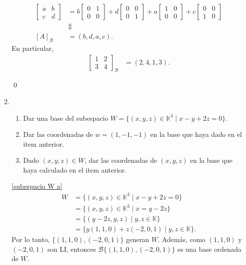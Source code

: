 \begin{enumerate}[topsep=6pt, itemsep=.4cm]
    \rta
    \begin{align*}
        \begin{bmatrix}
            a&b\\c&d 
            \end{bmatrix} &= b\begin{bmatrix}
            0&1\\0&0 
            \end{bmatrix}+d\begin{bmatrix}
            0&0\\0&1 
            \end{bmatrix}+a\begin{bmatrix}
            1&0\\0&0 
            \end{bmatrix}+c\begin{bmatrix}
            0&0\\1&0 
            \end{bmatrix} \\
            &\Updownarrow \\
            [A]_{\mathcal{B}} &= (b,d,a,c). 
    \end{align*}
    En particular,
    \begin{align*}
        \begin{bmatrix}
            1&2\\3&4 
            \end{bmatrix}_{\mathcal{B}} &= (2,4,1,3).
    \end{align*}


    \qed
    
    

\item 
\begin{enumerate}
    \item\label{subespacio W a} Dar una base del subespacio $W=\{(x,y,z)\in\mathbb{K}^3\mid x-y+2z=0\}$. 
    \item\label{subespacio W b} Dar las coordenadas de $w=(1,-1,-1)$ en la base que haya dado en el item anterior.
    \item\label{subespacio W c} Dado $(x,y,z)\in W$, dar las coordenadas de $(x,y,z)$ en la base que haya calculado en el item anterior. 
\end{enumerate}

\rta

\ref{subespacio W a} 
\begin{align*}
    W &= \{(x,y,z)\in\mathbb{K}^3\mid x-y+2z=0\} \\
    &= \{(x,y,z)\in\mathbb{K}^3\mid x=y-2z\} \\
    &= \{(y-2z,y,z)\mid y,z\in\mathbb{K}\} \\
    &= \{y(1,1,0)+z(-2,0,1)\mid y,z\in\mathbb{K}\}.
\end{align*}
Por lo tanto, $\{(1,1,0),(-2,0,1)\}$ generan $W$. Además, como $(1,1,0)$ y $(-2,0,1)$ son LI, entonces $\mathcal{B}\{(1,1,0),(-2,0,1)\}$ es una base ordenada de $W$. 


\end{enumerate}
